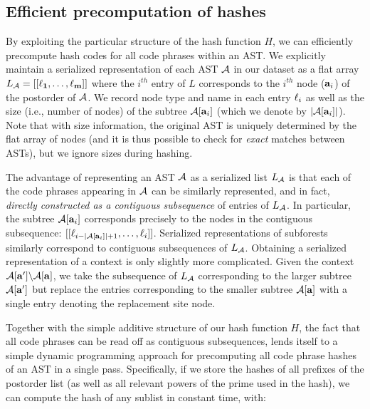 \subsection{Efficient precomputation of hashes}
By exploiting the particular structure of the hash function $H$, we can efficiently precompute
hash codes for all code phrases within an AST.
We explicitly maintain  a serialized representation of each AST $\mathcal{A}$ in our dataset
as a flat array $L_{\mathcal{A}}=[[{\bf\ell_1},\dots,{\bf\ell_m}]]$ 
where the $i^{th}$ entry of $L$ corresponds to the $i^{th}$ node (${\bf a}_{i}$) of the postorder of $\mathcal{A}$.
We record node type and name in each entry ${\bf \ell}_{i}$ as
well as the size (i.e., number of nodes) of the subtree $\mathcal{A}[{\bf a}_{i}]$ (which we denote by $|\mathcal{A}[{\bf a}_{i}]|$).
Note that with size information,  the original AST is uniquely determined by the flat array of nodes (and it is thus possible
to check for \emph{exact} matches between ASTs), but we ignore sizes during hashing.

The advantage of representing an AST $\mathcal{A}$ as a serialized list $L_{\mathcal{A}}$
is that each of the code phrases appearing in $\mathcal{A}$ can be similarly represented, and in fact, \emph{directly
constructed as a contiguous subsequence} of entries of $L_{\mathcal{A}}$.
In particular, the subtree $\mathcal{A}[{\bf a}_{i}]$ corresponds precisely to the nodes in 
the contiguous subsequence: $[[{\bf \ell}_{i - |\mathcal{A}[{\bf a}_{i}]| + 1},\dots,{\bf \ell}_{i}]]$.
Serialized representations of subforests similarly correspond to contiguous subsequences of $L_{\mathcal{A}}$.
Obtaining a serialized representation of a context is only slightly more complicated.  Given the context  $\mathcal{A}[{\bf a}']\backslash\mathcal{A}[{\bf a}]$,
we take the subsequence of $L_{\mathcal{A}}$ corresponding to the larger subtree $\mathcal{A}[{\bf a}']$ but replace the entries corresponding to the smaller subtree $\mathcal{A}[{\bf a}]$
with a single entry denoting the replacement site node.

Together with the simple additive structure of our hash function $H$, the fact that all code phrases can be read off as contiguous subsequences, 
lends itself to a simple dynamic programming approach for precomputing all code phrase hashes of an AST in a single pass.
Specifically, if we store the hashes of all prefixes of the postorder list (as well as all relevant powers 
of the prime used in the hash), we can compute the hash of any sublist in constant time, with:

